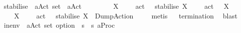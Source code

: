 \begin{isabellebody}
\ stabilise\ {\isacharcolon}{\kern0pt}{\isacharcolon}{\kern0pt}\ {\isacartoucheopen}{\isacharparenleft}{\kern0pt}{\isacharprime}{\kern0pt}a{\isacharparenright}{\kern0pt}Act{\isacharunderscore}{\kern0pt}{\isasymtheta}\ set\ {\isasymRightarrow}\ {\isacharparenleft}{\kern0pt}{\isacharprime}{\kern0pt}a{\isacharparenright}{\kern0pt}Act{\isacharunderscore}{\kern0pt}{\isasymtheta}{\isacartoucheclose}\isanewline
\ \ \ \isanewline
\ \ \ \ {\isacartoucheopen}{\isasymforall}\ {\isasymalpha}{\isasymin}X{\isachardot}{\kern0pt}\ {\isacharparenleft}{\kern0pt}{\isasymexists}\ {\isasymalpha}{\isacharprime}{\kern0pt}{\isachardot}{\kern0pt}\ {\isasymalpha}\ {\isacharequal}{\kern0pt}\ act\ {\isasymalpha}{\isacharprime}{\kern0pt}{\isacharparenright}{\kern0pt}\ {\isasymLongrightarrow}\ stabilise\ X\ {\isacharequal}{\kern0pt}\ {\isasymepsilon}\ {\isacharbraceleft}{\kern0pt}{\isasymalpha}{\isacharprime}{\kern0pt}\ {\isachardot}{\kern0pt}\ act\ {\isasymalpha}{\isacharprime}{\kern0pt}\ {\isasymin}\ X{\isacharbraceright}{\kern0pt}{\isacartoucheclose}\isanewline
\ \ {\isacharbar}{\kern0pt}\ {\isacartoucheopen}{\isasymexists}\ {\isasymalpha}{\isasymin}X{\isachardot}{\kern0pt}\ {\isacharparenleft}{\kern0pt}{\isasymnexists}\ {\isasymalpha}{\isacharprime}{\kern0pt}{\isachardot}{\kern0pt}\ {\isasymalpha}\ {\isacharequal}{\kern0pt}\ act\ {\isasymalpha}{\isacharprime}{\kern0pt}{\isacharparenright}{\kern0pt}\ {\isasymLongrightarrow}\ stabilise\ X\ {\isacharequal}{\kern0pt}\ DumpAction{\isacartoucheclose}\ \isanewline
%
\isadelimproof
\ \ %
\endisadelimproof
%
\isatagproof
{}\isamarkupfalse%
\ metis{\isacharplus}{\kern0pt}%
\endisatagproof
{\isafoldproof}%
%
\isadelimproof
\isanewline
%
\endisadelimproof
{}\isamarkupfalse%
%
\isadelimproof
\ %
\endisadelimproof
%
\isatagproof
{}\isamarkupfalse%
\ {\isachardoublequoteopen}termination{\isachardoublequoteclose}\ \isamarkupfalse%
\ blast%
\endisatagproof
{\isafoldproof}%
%
\isadelimproof
%
\endisadelimproof
\isanewline
\isanewline
{}\isamarkupfalse%
\ in{\isacharunderscore}{\kern0pt}env\ {\isacharcolon}{\kern0pt}{\isacharcolon}{\kern0pt}\ {\isacartoucheopen}{\isacharparenleft}{\kern0pt}{\isacharprime}{\kern0pt}a{\isacharparenright}{\kern0pt}Act{\isacharunderscore}{\kern0pt}{\isasymtheta}\ set\ option\ {\isasymRightarrow}\ {\isacharprime}{\kern0pt}s\ {\isasymRightarrow}\ {\isacharparenleft}{\kern0pt}{\isacharprime}{\kern0pt}s{\isacharcomma}{\kern0pt}\ {\isacharprime}{\kern0pt}a{\isacharparenright}{\kern0pt}Proc{\isacharunderscore}{\kern0pt}{\isasymtheta}{\isacartoucheclose}\isanewline

\end{isabellebody}
